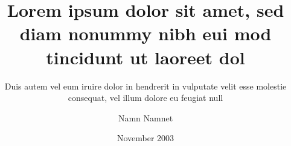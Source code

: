 \title{Lorem ipsum dolor sit amet, sed diam nonummy nibh eui
       mod tincidunt ut laoreet dol}
\subtitle{Duis autem vel eum iruire dolor in hendrerit in
          vulputate velit esse molestie consequat, vel illum
          dolore eu feugiat null}
\author{Namn Namnet}
\date{November 2003}
